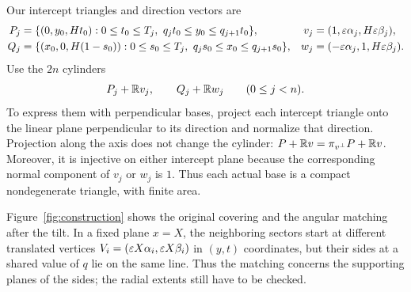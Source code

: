 Our intercept triangles and direction vectors are
\begin{align}
 P_j&=\{(0,y_0,Ht_0):0\le t_0\le T_j,
                  \ q_jt_0\le y_0\le q_{j+1}t_0\},
 &v_j&=(1,\varepsilon\alpha_j,H\varepsilon\beta_j),\label{eq:first-family}\\
 Q_j&=\{(x_0,0,H(1-s_0)):0\le s_0\le T_j,
                  \ q_js_0\le x_0\le q_{j+1}s_0\},
 &w_j&=(-\varepsilon\alpha_j,1,H\varepsilon\beta_j).\label{eq:second-family}
\end{align}
Use the $2n$ cylinders
\[
 P_j+\mathbb R v_j,\qquad Q_j+\mathbb R w_j\qquad(0\le j<n).
\]
To express them with perpendicular bases, project each intercept triangle onto the linear plane perpendicular to its direction and normalize that direction.
Projection along the axis does not change the cylinder:
$P+\mathbb R v=\pi_{v^\perp}P+\mathbb R v$.
Moreover, it is injective on either intercept plane because the corresponding normal component of $v_j$ or $w_j$ is $1$.
Thus each actual base is a compact nondegenerate triangle, with finite area.

Figure~\ref{fig:construction} shows the original covering and the angular
matching after the tilt. In a fixed plane $x=X$, the neighboring sectors
start at different translated vertices
$V_i=(\varepsilon X\alpha_i,\varepsilon X\beta_i)$ in $(y,t)$ coordinates, but their
sides at a shared value of $q$ lie on the same line. Thus the matching
concerns the supporting planes of the sides; the radial extents still
have to be checked.


